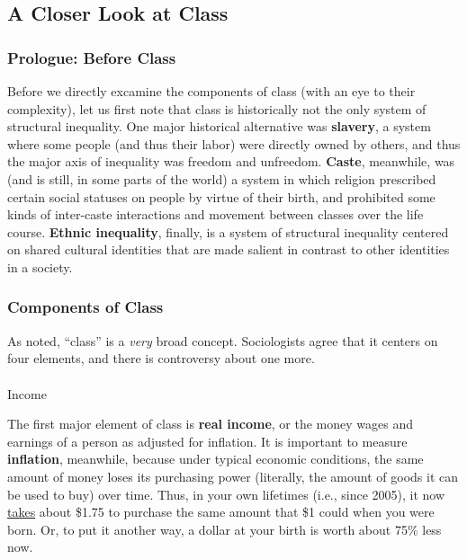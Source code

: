 \documentclass[
  letterpaper,
  DIV=11,
  numbers=noendperiod,
  oneside]{scrartcl}
\makeatletter
\let\oldparagraph\paragraph
\renewcommand{\paragraph}{
    \@ifstar
      \xxxParagraphStar
      \xxxParagraphNoStar
  }
\newcommand{\xxxParagraphStar}[1]{\oldparagraph*{#1}\mbox{}}
\newcommand{\xxxParagraphNoStar}[1]{\oldparagraph{#1}\mbox{}}
\makeatother
\begin{document}
\subsection{A Closer Look at Class}\label{a-closer-look-at-class}

\subsubsection{Prologue: Before Class}\label{prologue-before-class}

Before we directly excamine the components of class (with an eye to
their complexity), let us first note that class is historically not the
only system of structural inequality. One major historical alternative
was \textbf{slavery}, a system where some people (and thus their labor)
were directly owned by others, and thus the major axis of inequality was
freedom and unfreedom. \textbf{Caste}, meanwhile, was (and is still, in
some parts of the world) a system in which religion prescribed certain
social statuses on people by virtue of their birth, and prohibited some
kinds of inter-caste interactions and movement between classes over the
life course. \textbf{Ethnic inequality}, finally, is a system of
structural inequality centered on shared cultural identities that are
made salient in contrast to other identities in a society.

\subsubsection{Components of Class}\label{components-of-class}

As noted, ``class'' is a \emph{very} broad concept. Sociologists agree
that it centers on four elements, and there is controversy about one
more.

\paragraph{Income}\label{income}

The first major element of class is \textbf{real income}, or the money
wages and earnings of a person as adjusted for inflation. It is
important to measure \textbf{inflation}, meanwhile, because under
typical economic conditions, the same amount of money loses its
purchasing power (literally, the amount of goods it can be used to buy)
over time. Thus, in your own lifetimes (i.e., since 2005), it now
\href{https://www.bls.gov/data/inflation_calculator.htm\#}{takes} about
\$1.75 to purchase the same amount that \$1 could when you were
born. Or, to
put it another way, a dollar at your birth is worth about 75\% less now.
\end{document}
